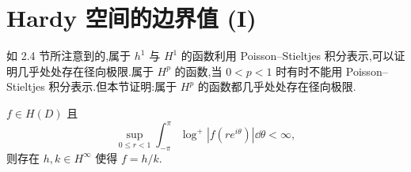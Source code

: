 \section{Hardy 空间的边界值 (I)}\label{sec:2.5}


如 2.4 节所注意到的,属于 $h^{1}$ 与 $H^{1}$ 的函数利用 Poisson--Stieltjes 积分表示,可以证明几乎处处存在径向极限.属于 $H^{p}$ 的函数,当 $0 < p < 1$ 时有时不能用 Poisson--Stieltjes 积分表示.但本节证明:属于 $H^{p}$ 的函数都几乎处处存在径向极限.

\begin{lemma}\label{lem:2.5.1}
$f \in H(D)$ 且
\begin{equation*}
\sup_{0 \leq r < 1}\int_{-\pi}^{\pi}\log^{+}|f(re^{i\theta})|\dd\theta < \infty,
\end{equation*}
则存在 $h, k \in H^{\infty}$ 使得 $f = h/k$.
\end{lemma}


